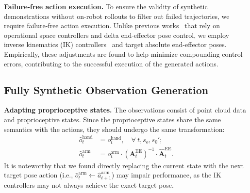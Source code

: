 \vspace{0.2cm} \noindent\textbf{Failure-free action execution.}
To ensure the validity of synthetic demonstrations without on-robot rollouts to filter out failed trajectories, we require failure-free action execution. Unlike previous works~\cite{mandlekar2023mimicgen, garrett2024skillmimicgen} that rely on operational space controllers and delta end-effector pose control, we employ inverse kinematics (IK) controllers~\cite{Zakka_Mink_Python_inverse_2024} and target absolute end-effector poses. Empirically, these adjustments are found to help minimize compounding control errors, contributing to the successful execution of the generated actions.

\subsection{Fully Synthetic Observation Generation}

\noindent\textbf{Adapting proprioceptive states.} 
The observations consist of point cloud data and proprioceptive states. Since the proprioceptive states share the same semantics with the actions, they should undergo the same transformation:
\begin{align*}
    \hat{o}^{\mathrm{hand}}_t&=o^{\mathrm{hand}}_t, \quad\forall~ t, s_o, s_0'; \\
    \hat{o}^{\mathrm{arm}}_t&=o^{\mathrm{arm}}_t \cdot ({\mathbf{A}}^\mathrm{EE}_t)^{-1} \cdot \hat{{\mathbf{A}}}^\mathrm{EE}_t.
\end{align*}
It is noteworthy that we found directly replacing the current state with the next target pose action (i.e., $\hat{o}^{\mathrm{arm}}_t \gets \hat{a}^{\mathrm{arm}}_{t+1}$) may impair performance, as the IK controllers may not always achieve the exact target pose.


